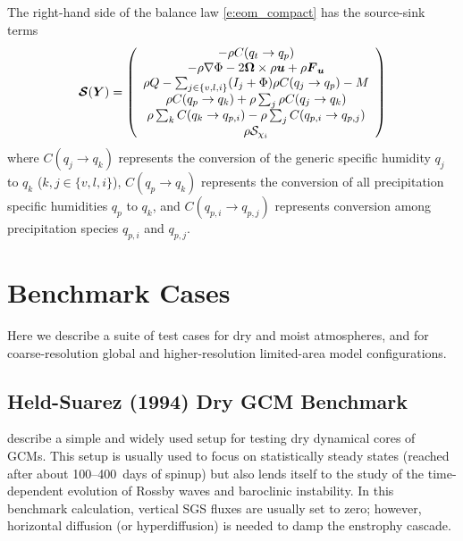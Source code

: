 \documentclass{report}
\begin{document}
The right-hand side of the balance law \eqref{e:eom_compact} has the source-sink terms
\begin{multline}
\Source(\vec{Y})= 
 \left( \begin{array}{c}
 -\rho C(q_t \rightarrow q_p) \\
  -\rho \grad\Phi - 2 \vec{\Omega} \times \rho\vec{u}  + \rho \vec{F}_{\vec{u}} \\
 \rho Q - \sum_{j\in\{v,l,i\}} (I_j + \Phi)  \rho C(q_j \rightarrow q_p) - M \\%
\rho C(q_p \rightarrow q_k) + \rho \sum_j \rho C(q_j \rightarrow q_k) \\
\rho \sum_k C(q_k \rightarrow q_{p, i}) - \rho \sum_j C(q_{p, i} \rightarrow q_{p, j})\\
\rho \mathcal{S}_{\chi_i}
\end{array}
\right)
\label{eq:source}
\end{multline}
where $C(q_j \rightarrow q_k)$ represents the conversion of the generic specific humidity $q_j$ to $q_k$ ($k, j \in \{v, l, i\}$), $C(q_p \rightarrow q_k)$ represents the conversion of all precipitation specific humidities $q_p$ to $q_k$, and $C(q_{p, i} \rightarrow q_{p, j})$ represents conversion among precipitation species $q_{p, i}$ and $q_{p, j}$. 

\chapter{Benchmark Cases}

Here we describe a suite of test cases for dry and moist atmospheres, and for coarse-resolution global and higher-resolution limited-area model configurations. 

\section{Held-Suarez (1994) Dry GCM Benchmark}

\citet{Held94} describe a simple and widely used setup for testing dry dynamical cores of GCMs. This setup is usually used to focus on statistically steady states (reached after about 100--400~days of spinup) but also lends itself to the study of the time-dependent evolution of Rossby waves and baroclinic instability. In this benchmark calculation, vertical SGS fluxes are usually set to zero; however, horizontal diffusion (or hyperdiffusion) is needed to damp the enstrophy cascade. 
\end{document}
